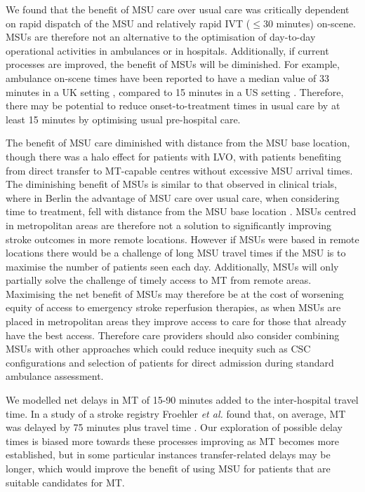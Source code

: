 We found that the benefit of MSU care over usual care was critically dependent on rapid dispatch of the MSU and relatively rapid IVT ($\leq$30 minutes) on-scene. MSUs are therefore not an alternative to the optimisation of day-to-day operational activities in ambulances or in hospitals. Additionally, if current processes are improved, the benefit of MSUs will be diminished. For example, ambulance on-scene times have been reported to have a median value of 33 minutes in a UK setting \cite{mcclelland_what_2023}, compared to 15 minutes in a US setting \cite{patel_evaluation_2014}. Therefore, there may be potential to reduce onset-to-treatment times in usual care by at least 15 minutes by optimising usual pre-hospital care.

The benefit of MSU care diminished with distance from the MSU base location, though there was a halo effect for patients with LVO, with patients benefiting from direct transfer to MT-capable centres without excessive MSU arrival times. The diminishing benefit of MSUs is similar to that observed in clinical trials, where in Berlin the advantage of MSU care over usual care, when considering time to treatment, fell with distance from the MSU base location \cite{koch_influence_2016}. MSUs centred in metropolitan areas are therefore not a solution to significantly improving stroke outcomes in more remote locations. However if MSUs were based in remote locations there would be a challenge of long MSU travel times if the MSU is to maximise the number of patients seen each day. Additionally, MSUs will only partially solve the challenge of timely access to MT from remote areas. Maximising the net benefit of MSUs may therefore be at the cost of worsening equity of access to emergency stroke reperfusion therapies, as when MSUs are placed in metropolitan areas they improve access to care for those that already have the best access. Therefore care providers should also consider combining MSUs with other approaches which could reduce inequity such as CSC configurations and selection of patients for direct admission during standard ambulance assessment. 

We modelled net delays in MT of 15-90 minutes added to the inter-hospital travel time. In a study of a stroke registry Froehler \textit{et al.} found that, on average, MT was delayed by 75 minutes plus travel time \cite{ froehler_interhospital_2017}. Our exploration of possible delay times is biased more towards these processes improving as MT becomes more established, but in some particular instances transfer-related delays may be longer, which would improve the benefit of using MSU for patients that are suitable candidates for MT.

